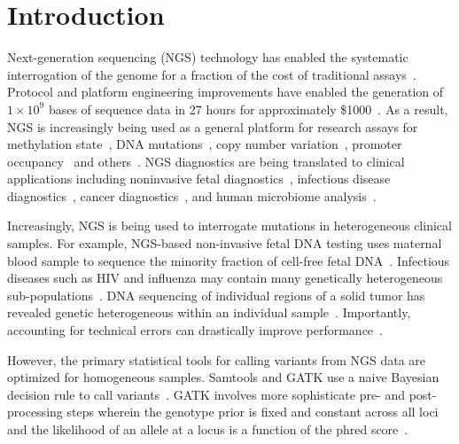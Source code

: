 \documentclass{bioinfo}
\begin{document}
\section{Introduction}
\label{sec:intro}
Next-generation sequencing (NGS) technology has enabled the systematic interrogation of the genome for a fraction of the cost of traditional assays~\citep{Koboldt:2013kw}. 
Protocol and platform engineering improvements have enabled the generation of $1\times10^9$ bases of sequence data in 27 hours for approximately \$1000~\citep{Quail:2012hf}. 
As a result, NGS is increasingly being used as a general platform for research assays for methylation state~\citep{Laird:2010ab}, DNA mutations~\citep{Consortium:2013co}, copy number variation~\citep{Alkan:2009cr}, promoter occupancy~\citep{Ouyang:2009hc} and others~\citep{Rivera:2013ee}. 
NGS diagnostics are being translated to clinical applications including noninvasive fetal diagnostics~\citep{Kitzman:2012hea}, infectious disease diagnostics~\citep{Capobianchi:2012em}, cancer diagnostics~\citep{Navin:2010gu}, and human microbiome analysis~\citep{Consortium:2013iz}.

Increasingly, NGS is being used to interrogate mutations in heterogeneous clinical samples. For example, NGS-based non-invasive fetal DNA testing uses maternal blood sample to sequence the minority fraction of cell-free fetal DNA~\citep{Fan:2008di}. 
Infectious diseases such as HIV and influenza may contain many genetically heterogeneous sub-populations~\citep{Flaherty:2011ja, Ghedin:2010ie}. 
DNA sequencing of individual regions of a solid tumor has revealed genetic heterogeneous within an individual sample~\citep{Navin:2010gu}. 
Importantly, accounting for technical errors can drastically improve performance~\citep{zagordi2010error}.

However, the primary statistical tools for calling variants from NGS data are optimized for homogeneous samples. Samtools and GATK use a naive Bayesian decision rule to call variants~\citep{li2011statistical, depristo2011framework}. GATK involves more sophisticate pre- and post-processing steps wherein the genotype prior is fixed and constant across all loci and the likelihood of an allele at a locus is a function of the phred score~\citep{McKenna:2010bv}.
\end{document}

